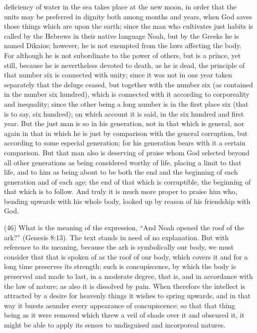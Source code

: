 deficiency of water in the sea takes place at the new moon, in order that the units may be
preferred in dignity both among months and years, when God saves those things which are upon
the earth; since the man who cultivates just habits is called by the Hebrews in their native language
Noah, but by the Greeks he is named Dikaios; however, he is not exempted from the laws
affecting the body. For although he is not subordinate to the power of others, but is a prince, yet
still, because he is nevertheless devoted to death, as he is dead, the principle of that number six is
connected with unity; since it was not in one year taken separately that the deluge ceased, but
together with the number six (as contained in the number six hundred), which is connected with it
according to corporeality and inequality; since the other being a long number is in the first place six
(that is to say, six hundred); on which account it is said, in the six hundred and first year. But the
just man is so in his generation, not in that which is general, nor again in that in which he is just by
comparison with the general corruption, but according to some especial generation; for his
generation bears with it a certain comparison. But that man also is deserving of praise whom God
selected beyond all other generations as being considered worthy of life, placing a limit to that life,
and to him as being about to be both the end and the beginning of each generation and of each
age; the end of that which is corruptible, the beginning of that which is to follow. And truly it is much
more proper to praise him who, bending upwards with his whole body, looked up by reason of his
friendship with God.

(46) What is the meaning of the expression, ``And Noah opened the roof of the ark?'' (Genesis
8:13). The text stands in need of no explanation. But with reference to its meaning, because the
ark is symbolically our body, we must consider that that is spoken of as the roof of our body, which
covers it and for a long time preserves its strength; such is concupiscence, by which the body is
preserved and made to last, in a moderate degree, that is, and in accordance with the law of
nature; as also it is dissolved by pain. When therefore the intellect is attracted by a desire for
heavenly things it wishes to spring upwards, and in that way it bursts asunder every appearance of
concupiscence; so that that thing being as it were removed which threw a veil of shade over it and
obscured it, it might be able to apply its senses to undisguised and incorporeal natures.

